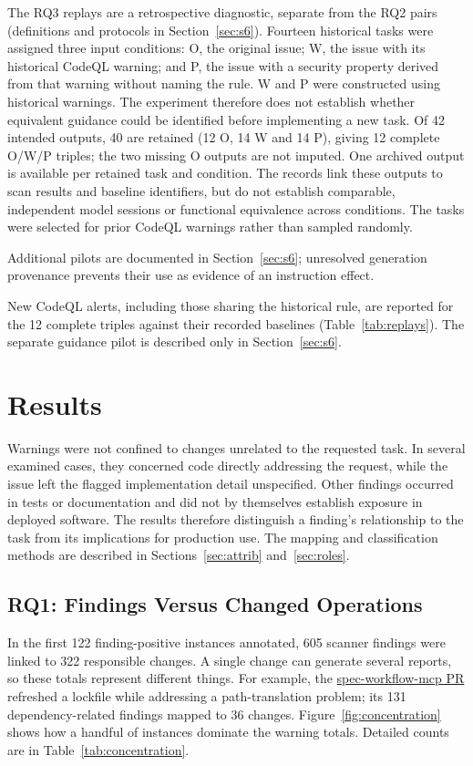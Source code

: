 \documentclass[acmsmall,screen,nonacm]{acmart}
\begin{document}
The RQ3 replays are a retrospective diagnostic, separate from the RQ2 pairs (definitions and protocols in Section~\ref{sec:s6}). Fourteen historical tasks were assigned three input conditions: O, the original issue; W, the issue with its historical CodeQL warning; and P, the issue with a security property derived from that warning without naming the rule. W and P were constructed using historical warnings. The experiment therefore does not establish whether equivalent guidance could be identified before implementing a new task. Of 42 intended outputs, 40 are retained (12 O, 14 W and 14 P), giving 12 complete O/W/P triples; the two missing O outputs are not imputed. One archived output is available per retained task and condition. The records link these outputs to scan results and baseline identifiers, but do not establish comparable, independent model sessions or functional equivalence across conditions. The tasks were selected for prior CodeQL warnings rather than sampled randomly.

Additional pilots are documented in Section~\ref{sec:s6}; unresolved generation provenance prevents their use as evidence of an instruction effect.

New CodeQL alerts, including those sharing the historical rule, are reported for the 12 complete triples against their recorded baselines (Table~\ref{tab:replays}). The separate guidance pilot is described only in Section~\ref{sec:s6}.

\section{Results}

Warnings were not confined to changes unrelated to the requested task. In several examined cases, they concerned code directly addressing the request, while the issue left the flagged implementation detail unspecified. Other findings occurred in tests or documentation and did not by themselves establish exposure in deployed software. The results therefore distinguish a finding's relationship to the task from its implications for production use. The mapping and classification methods are described in Sections~\ref{sec:attrib} and~\ref{sec:roles}.

\subsection{RQ1: Findings Versus Changed Operations}\label{sec:rq1-roles}

In the first 122 finding-positive instances annotated, 605 scanner findings were linked to 322 responsible changes. A single change can generate several reports, so these totals represent different things. For example, the \href{https://github.com/Pimzino/spec-workflow-mcp/pull/173}{spec-workflow-mcp PR} refreshed a lockfile while addressing a path-translation problem; its 131 dependency-related findings mapped to 36 changes. Figure~\ref{fig:concentration} shows how a handful of instances dominate the warning totals. Detailed counts are in Table~\ref{tab:concentration}.
\end{document}
